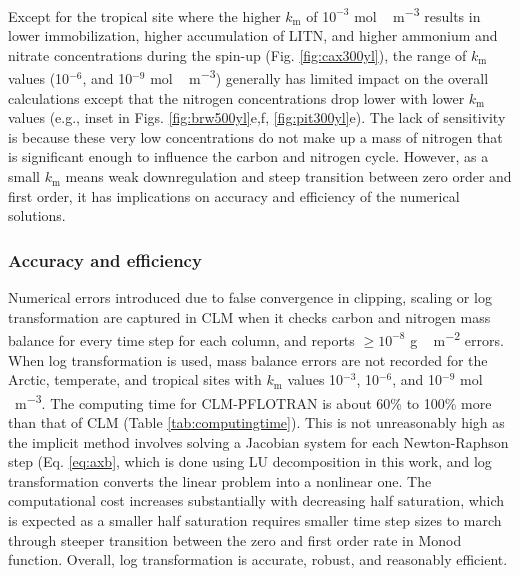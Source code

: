 \documentclass[gmd, manuscript]{copernicus}
\begin{document}
Except for the tropical site where the higher $k_\text{m}$ of 1$0^{-3}$
\unit{mol\,m^{-3}} results in lower immobilization, higher accumulation of
LITN, and higher ammonium and nitrate concentrations during the spin-up (Fig.
\ref{fig:cax300yl}), the range of $k_\text{m}$ values (10$^{-6}$,
and 10$^{-9}$ \unit{mol\,m^{-3}}) generally has limited impact on the overall
calculations except that the nitrogen concentrations drop lower with lower
$k_\text{m}$ values (e.g., inset in Figs. \ref{fig:brw500yl}e,f,
\ref{fig:pit300yl}e). The lack of
sensitivity is because these very low concentrations do not make up a mass of
nitrogen that is significant enough to influence the carbon and nitrogen cycle.
However, as a small $k_\text{m}$ means weak downregulation and steep transition
between zero order and first order, it has implications on accuracy
and efficiency of the numerical solutions.

\subsubsection{Accuracy and efficiency}
Numerical errors introduced due to false convergence in clipping, scaling or
log transformation are captured in CLM when it checks carbon and nitrogen mass
balance for every time step for each column, and reports  $\geq 10^{-8}$
\unit{g\,m^{-2}} errors.  When log transformation is used, 
mass balance errors are not recorded for the Arctic, temperate, and tropical
sites with $k_\text{m}$ values 
10$^{-3}$, 10$^{-6}$, and 10$^{-9}$ \unit{mol\,m^{-3}}. The computing time for
CLM-PFLOTRAN is about 60\% to 100\% more than that of CLM (Table
\ref{tab:computingtime}). This is not unreasonably high as the implicit
method involves solving a Jacobian system for each Newton-Raphson step (Eq. \ref{eq:axb}, which is done using LU decomposition in this work, and log transformation converts
the linear
problem into a nonlinear one. 
The computational cost increases substantially with
decreasing half saturation, which is expected as a smaller half saturation
requires smaller time step sizes to march through steeper transition between
the zero and first order rate in Monod function. Overall, log transformation is
accurate, robust, and reasonably efficient.  
\end{document}
